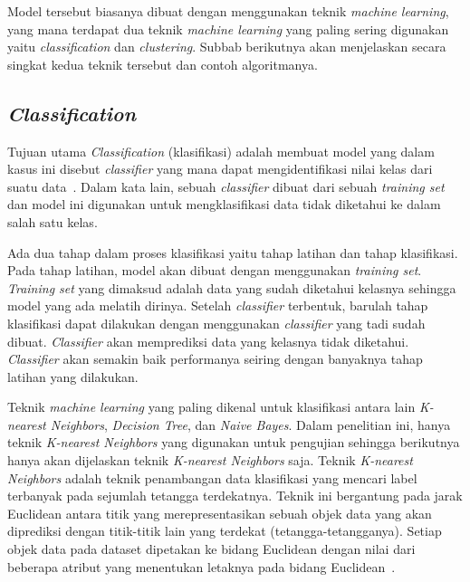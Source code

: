 Model tersebut biasanya dibuat dengan menggunakan teknik \textit{machine learning}, yang mana terdapat dua teknik \textit{machine learning} yang paling sering digunakan yaitu \textit{classification} dan \textit{clustering}. Subbab berikutnya akan menjelaskan secara singkat kedua teknik tersebut dan contoh algoritmanya.

\subsection{\textit{Classification}}
\label{subsec:classification}

Tujuan utama \textit{Classification} (klasifikasi) adalah membuat model yang dalam kasus ini disebut \textit{classifier} yang mana dapat mengidentifikasi nilai kelas dari suatu data~\cite{mendes:17:ppdmieee}. Dalam kata lain, sebuah \textit{classifier} dibuat dari sebuah \textit{training set} dan model ini digunakan untuk mengklasifikasi data tidak diketahui ke dalam salah satu kelas.

Ada dua tahap dalam proses klasifikasi yaitu tahap latihan dan tahap klasifikasi. Pada tahap latihan, model akan dibuat dengan menggunakan \textit{training set}. \textit{Training set} yang dimaksud adalah data yang sudah diketahui kelasnya sehingga model yang ada melatih dirinya. Setelah \textit{classifier} terbentuk, barulah tahap klasifikasi dapat dilakukan dengan menggunakan \textit{classifier} yang tadi sudah dibuat. \textit{Classifier} akan memprediksi data yang kelasnya tidak diketahui. \textit{Classifier} akan semakin baik performanya seiring dengan banyaknya tahap latihan yang dilakukan.

Teknik \textit{machine learning} yang paling dikenal untuk klasifikasi antara lain \textit{K-nearest Neighbors}, \textit{Decision Tree}, dan \textit{Naive Bayes}. Dalam penelitian ini, hanya teknik \textit{K-nearest Neighbors} yang digunakan untuk pengujian sehingga berikutnya hanya akan dijelaskan teknik \textit{K-nearest Neighbors} saja. Teknik \textit{K-nearest Neighbors} adalah teknik penambangan data klasifikasi yang mencari label terbanyak pada sejumlah tetangga terdekatnya. Teknik ini bergantung pada jarak Euclidean antara titik yang merepresentasikan sebuah objek data yang akan diprediksi dengan titik-titik lain yang terdekat (tetangga-tetangganya). Setiap objek data pada dataset dipetakan ke bidang Euclidean dengan nilai dari beberapa atribut yang menentukan letaknya pada bidang Euclidean~\cite{jiawei:12:datmin}.

